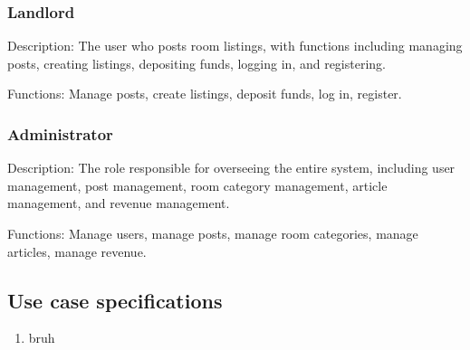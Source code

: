\documentclass[../Main.tex]{subfiles}
\begin{document}
\subsubsection{Landlord}
Description: The user who posts room listings, with functions including managing posts, creating listings, depositing funds, logging in, and registering.

Functions: Manage posts, create listings, deposit funds, log in, register.

\subsubsection{Administrator}

Description: The role responsible for overseeing the entire system, including user management, post management, room category management, article management, and revenue management.

Functions: Manage users, manage posts, manage room categories, manage articles, manage revenue.

\subsection{Use case specifications}

\begin{enumerate}
    \item bruh
\end{enumerate}
\end{document}
